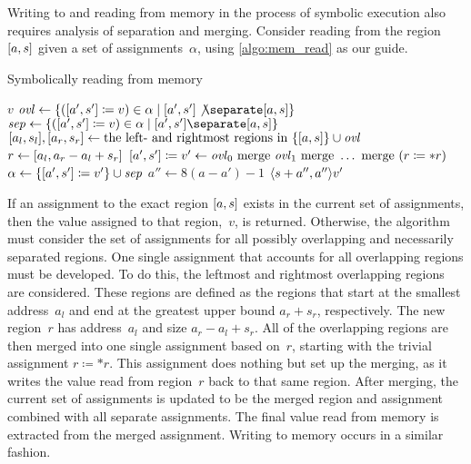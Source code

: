 Writing to and reading from memory in the process of symbolic execution
also requires analysis of separation and merging.
Consider reading from the region $[a,s]$ given a set of assignments~$\alpha$,
using \cref{algo:mem_read} as our guide.
\begin{algorithm}
  \caption{Symbolically reading from memory}\label{algo:mem_read}
  \begin{algorithmic}
        \State\Return $v$
      \Else
        \State $\var{ovl}\gets\{(\region{a'}{s'}\coloneqq v)\in
        \alpha\mid\region{a'}{s'}\not\separate\region{a}{s}\}$
        \State $\var{sep}\gets\{(\region{a'}{s'}\coloneqq v)\in
        \alpha\mid\region{a'}{s'}\separate\region{a}{s}\}$
        \State $[a_l,s_l],[a_r,s_r]\gets
        \text{the left- and rightmost regions in }\{[a,s]\}\cup\mathit{ovl}$
        \State $r\gets[a_l,a_r-a_l+s_r]$
        \State $[a',s']\coloneqq v'\gets
        \mathit{ovl}_0\text{ merge }\mathit{ovl}_1\text{ merge }\ldots\text{ merge }(r\coloneqq *r)$
        \State $\alpha\gets\{[a',s']\coloneqq v'\}\cup\mathit{sep}$
        \State $a''\gets8(a-a')-1$
        \State\Return $\langle s+a'',a''\rangle v'$
      \EndIf
    \EndFunction
  \end{algorithmic}
\end{algorithm}
If an assignment to the exact region $[a,s]$
exists in the current set of assignments,
then the value assigned to that region,~$v$, is returned.
Otherwise, the algorithm must consider the set of assignments
for all possibly overlapping and necessarily separated regions.
One single assignment that accounts for all overlapping regions must be developed.
To do this, the leftmost and rightmost overlapping regions are considered.
These regions are defined as the regions that start at the smallest address~$a_l$
and end at the greatest upper bound $a_r+s_r$, respectively.
The new region~$r$ has address~$a_l$ and size $a_r-a_l+s_r$.
All of the overlapping regions are then merged into one single assignment based on~$r$,
starting with the trivial assignment $r\coloneqq *r$.
This assignment does nothing but set up the merging,
as it writes the value read from region~$r$ back to that same region.
After merging, the current set of assignments is updated to be the merged region
and assignment combined with all separate assignments.
The final value read from memory is extracted from the merged assignment.
Writing to memory occurs in a similar fashion.

